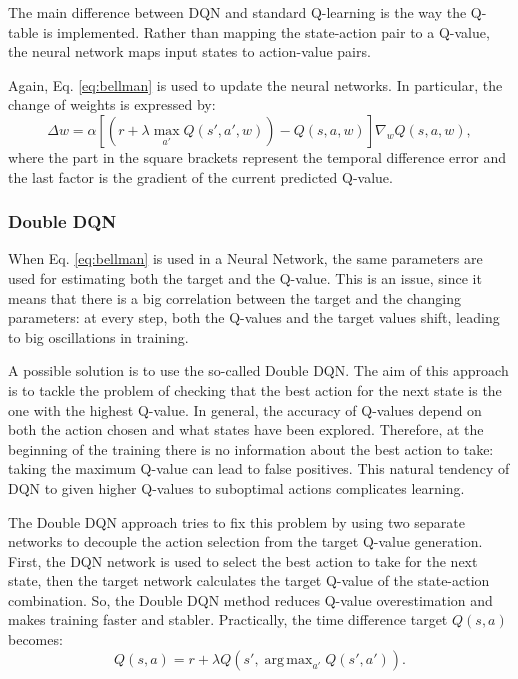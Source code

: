 \documentclass[a4paper, 12pt]{article}
\numberwithin{equation}{section}
\DeclareMathOperator*{\argmax}{arg\,max}
\begin{document}
The main difference between DQN and standard Q-learning is the way the Q-table is implemented. Rather than mapping the state-action pair to a Q-value, the neural network maps input states to action-value pairs.

Again, Eq. \eqref{eq:bellman} is used to update the neural networks. In particular, the change of weights is expressed by:
\begin{equation}\label{eq:weights}
	\Delta w = \alpha\left[\left(r+\lambda\max_{a'} Q\left(s',a',w\right)\right)-Q\left(s,a,w\right)\right]\nabla_wQ\left(s,a,w\right),
\end{equation}
where the part in the square brackets represent the temporal difference error and the last factor is the gradient of the current predicted Q-value.





\subsubsection{Double DQN}

When Eq. \eqref{eq:bellman} is used in a Neural Network, the same parameters are used for estimating both the target and the Q-value. This is an issue, since it means that there is a big correlation between the target and the changing parameters: at every step, both the Q-values and the target values shift, leading to big oscillations in training.

A possible solution is to use the so-called Double DQN. The aim of this approach is to tackle the problem of checking that the best action for the next state is the one with the highest Q-value. In general, the accuracy of Q-values depend on both the action chosen and what states have been explored. Therefore, at the beginning of the training there is no information about the best action to take: taking the maximum Q-value can lead to false positives. This natural tendency of DQN to given higher Q-values to suboptimal actions complicates learning.

The Double DQN approach tries to fix this problem by using two separate networks to decouple the action selection from the target Q-value generation. First, the DQN network is used to select the best action to take for the next state, then the target network calculates the target Q-value of the state-action combination. So, the Double DQN method reduces Q-value overestimation and makes training faster and stabler. Practically, the time difference target $Q\left(s,a\right)$ becomes:
\begin{equation}
	Q\left(s,a\right)=r+\lambda Q\left(s',\argmax_{a'}Q\left(s',a'\right)\right).
\end{equation}
\end{document}

